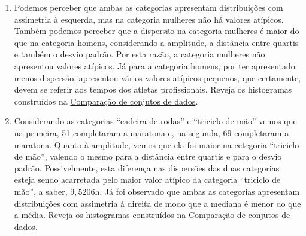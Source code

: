 \documentclass[10 pt,usenames,dvipsnames, oneside]{article}
\begin{document}
\begin{solucao}
\begin{enumerate}
\item Podemos perceber que ambas as categorias apresentam distribuições com assimetria à esquerda, mas na categoria mulheres não há valores atípicos. Também podemos perceber que a dispersão na categoria mulheres é maior do que na categoria homens, considerando a amplitude, a distância entre quartis e também o desvio padrão. Por esta razão, a categoria mulheres não apresentou valores atípicos. Já para a categoria homens, por ter apresentado menos dispersão, apresentou vários valores atípicos pequenos, que certamente, devem se referir aos tempos dos atletas profissionais. Reveja os histogramas construídos na \hyperref[\detokenize{PE104-5:ativ-compara-categorias}]{Comparação de conjutos de dados}.

\item Considerando as categorias “cadeira de rodas”{} e “triciclo de mão”{} vemos que na primeira, 51 completaram a maratona e, na segunda, 69 completaram a maratona. Quanto à amplitude, vemos que ela foi maior na cetegoria “triciclo de mão”, valendo o mesmo para a distância entre quartis e para o desvio padrão. Possivelmente, esta diferença nas dispersões das duas categorias esteja sendo acarretada pelo maior valor atípico da categoria “triciclo de mão”, a saber, $9{,}5206$h. Já foi observado que ambas as categorias apresentam distribuições com assimetria à direita de modo que a mediana é menor do que a média. Reveja os histogramas construídos na \hyperref[\detokenize{PE104-5:ativ-compara-categorias}]{Comparação de conjutos de dados}.
\end{enumerate}

\end{solucao}
\fi
\end{document}
